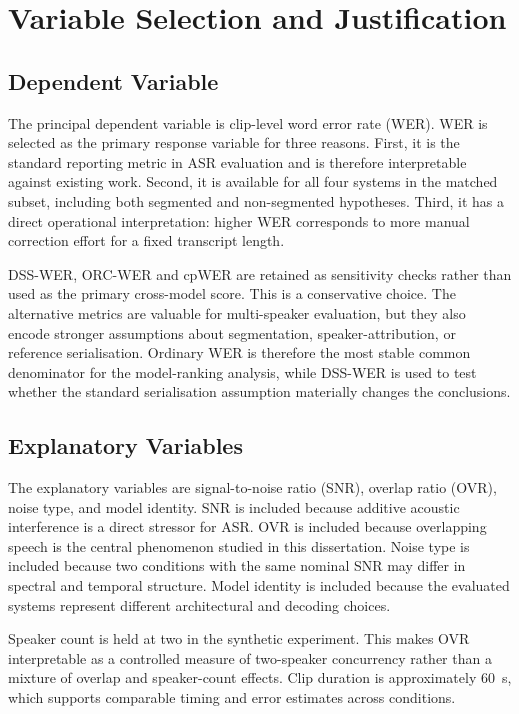 \section{Variable Selection and Justification}
\subsection{Dependent Variable}
The principal dependent variable is clip-level word error rate (WER). WER is selected as the
primary response variable for three reasons. First, it is the standard reporting metric in ASR
evaluation and is therefore interpretable against existing work. Second, it is available for all
four systems in the matched subset, including both segmented and non-segmented hypotheses. Third,
it has a direct operational interpretation: higher WER corresponds to more manual correction
effort for a fixed transcript length.

DSS-WER, ORC-WER and cpWER are retained as sensitivity checks rather than used as the primary
cross-model score. This is a conservative choice. The alternative metrics are valuable for
multi-speaker evaluation, but they also encode stronger assumptions about segmentation,
speaker-attribution, or reference serialisation. Ordinary WER is therefore the most stable
common denominator for the model-ranking analysis, while DSS-WER is used to test whether the
standard serialisation assumption materially changes the conclusions.

\subsection{Explanatory Variables}
The explanatory variables are signal-to-noise ratio (SNR), overlap ratio (OVR), noise type, and
model identity. SNR is included because additive acoustic interference is a direct stressor for
ASR. OVR is included because overlapping speech is the central phenomenon studied in this
dissertation. Noise type is included because two conditions with the same nominal SNR may differ
in spectral and temporal structure. Model identity is included because the evaluated systems
represent different architectural and decoding choices.

Speaker count is held at two in the synthetic experiment. This makes OVR interpretable as a
controlled measure of two-speaker concurrency rather than a mixture of overlap and speaker-count
effects. Clip duration is approximately \SI{60}{\second}, which supports comparable timing and
error estimates across conditions.

